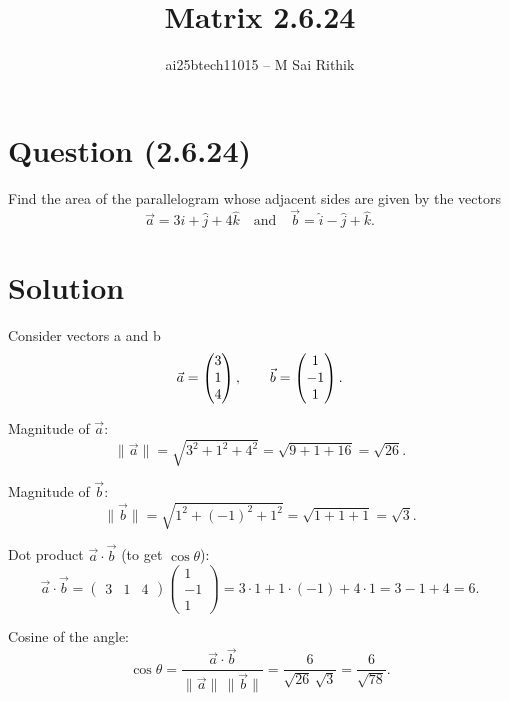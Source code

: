 \documentclass[12pt]{article}
\title{Matrix 2.6.24}
\author{ai25btech11015 -- M Sai Rithik}
\date{}
\begin{document}
\maketitle

\section*{Question (2.6.24)}
Find the area of the parallelogram whose adjacent sides are given by the vectors
$$\Vec{a} = 3\hat{i} + \hat{j} + 4\hat{k} \quad\text{and}\quad \Vec{b} = \hat{i} - \hat{j} + \hat{k}.$$

\section*{Solution}
Consider vectors a and b
\begin{equation}
\Vec{a} = \begin{pmatrix}3 \\ 1 \\ 4\end{pmatrix}, \qquad
\Vec{b} = \begin{pmatrix}1 \\ -1 \\ 1\end{pmatrix}.
\end{equation}

Magnitude of $\Vec{a}$:
\begin{equation}
\|\Vec{a}\| = \sqrt{3^2 + 1^2 + 4^2} = \sqrt{9 + 1 + 16} = \sqrt{26}.
\end{equation}

Magnitude of $\Vec{b}$:
\begin{equation}
\|\Vec{b}\| = \sqrt{1^2 + (-1)^2 + 1^2} = \sqrt{1 + 1 + 1} = \sqrt{3}.
\end{equation}

Dot product $\Vec{a}\cdot\Vec{b}$ (to get $\cos\theta$):
\begin{equation}
\Vec{a}\cdot\Vec{b} = 
\begin{pmatrix}3 & 1 & 4\end{pmatrix}
\begin{pmatrix}1 \\ -1 \\ 1\end{pmatrix}
= 3\cdot 1 + 1\cdot(-1) + 4\cdot 1 = 3 - 1 + 4 = 6.
\end{equation}

Cosine of the angle:
\begin{equation}
\cos\theta = \dfrac{\Vec{a}\cdot\Vec{b}}{\|\Vec{a}\|\,\|\Vec{b}\|}
= \dfrac{6}{\sqrt{26}\,\sqrt{3}} = \dfrac{6}{\sqrt{78}}.
\end{equation}
\end{document}
